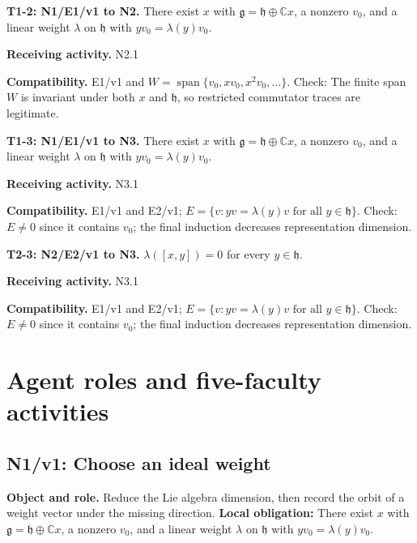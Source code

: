 \documentclass[preprint,12pt,aps,pra,showkeys,amsmath,amssymb,superscriptaddress,floatfix]{revtex4-2}
\theoremstyle{definition}
\theoremstyle{remark}
\newcommand{\field}[2]{\par\smallskip\noindent\textbf{#1.} #2\par}
\begin{document}
\begingroup\small\linespread{1.05}\selectfont

\field{T1-2: N1/E1/v1 to N2}{There exist \(x\) with \(\mathfrak g=\mathfrak h\oplus\mathbb Cx\), a
nonzero \(v_0\), and a linear weight \(\lambda\) on \(\mathfrak h\) with
\(yv_0=\lambda(y)v_0\).}

\field{Receiving activity}{N2.1}

\field{Compatibility}{E1/v1 and \(W=\operatorname{span}\{v_0,xv_0,x^2v_0,\ldots\}\). Check:
The finite span \(W\) is invariant under both \(x\) and \(\mathfrak h\),
so restricted commutator traces are legitimate.}

\field{T1-3: N1/E1/v1 to N3}{There exist \(x\) with \(\mathfrak g=\mathfrak h\oplus\mathbb Cx\), a
nonzero \(v_0\), and a linear weight \(\lambda\) on \(\mathfrak h\) with
\(yv_0=\lambda(y)v_0\).}

\field{Receiving activity}{N3.1}

\field{Compatibility}{E1/v1 and E2/v1;
\(E=\{v:yv=\lambda(y)v\text{ for all }y\in\mathfrak h\}\). Check:
\(E\ne0\) since it contains \(v_0\); the final induction decreases
representation dimension.}

\field{T2-3: N2/E2/v1 to N3}{\(\lambda([x,y])=0\) for every \(y\in\mathfrak h\).}

\field{Receiving activity}{N3.1}

\field{Compatibility}{E1/v1 and E2/v1;
\(E=\{v:yv=\lambda(y)v\text{ for all }y\in\mathfrak h\}\). Check:
\(E\ne0\) since it contains \(v_0\); the final induction decreases
representation dimension.}

\endgroup

\clearpage\section{Agent roles and five-faculty activities}\begingroup\small\linespread{1.05}\selectfont{}

\subsection{N1/v1: Choose an ideal weight}

\field{Object and role}{Reduce the Lie algebra dimension, then record the orbit of a weight
vector under the missing direction. \textbf{Local obligation:} There
exist \(x\) with \(\mathfrak g=\mathfrak h\oplus\mathbb Cx\), a nonzero
\(v_0\), and a linear weight \(\lambda\) on \(\mathfrak h\) with
\(yv_0=\lambda(y)v_0\).}
\end{document}
